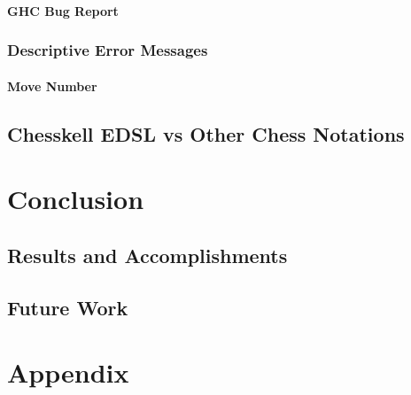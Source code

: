 \documentclass[12pt, a4paper, bibliography=totocnumbered]{scrreprt}
\begin{document}
\subsection{GHC Bug Report}

\section{Descriptive Error Messages}

\subsection{Move Number}

\chapter{Chesskell EDSL vs Other Chess Notations}


\part{Conclusion}

\chapter{Results and Accomplishments}

\chapter{Future Work}


\part{Appendix}






\end{document}
